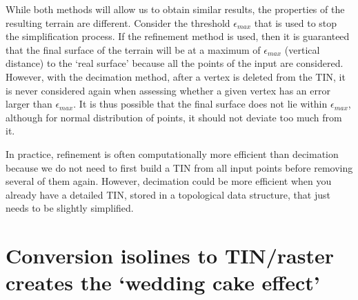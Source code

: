 While both methods will allow us to obtain similar results, the properties of the resulting terrain are different.
Consider the threshold $\epsilon_{max}$ that is used to stop the simplification process.
If the refinement method is used, then it is guaranteed that the final surface of the terrain will be at a maximum of $\epsilon_{max}$ (vertical distance) to the `real surface' because all the points of the input are considered.
However, with the decimation method, after a vertex is deleted from the TIN, it is never considered again when assessing whether a given vertex has an error larger than $\epsilon_{max}$. 
It is thus possible that the final surface does not lie within $\epsilon_{max}$, although for normal distribution of points, it should not deviate too much from it.

%

In practice, refinement is often computationally more efficient than decimation because we do not need to first build a TIN from all input points before removing several of them again. 
However, decimation could be more efficient when you already have a detailed TIN, stored in a topological data structure, that just needs to be slightly simplified.

%
\section{Conversion isolines to TIN/raster creates the `wedding cake effect'}%
\label{sec:weddingcake}

